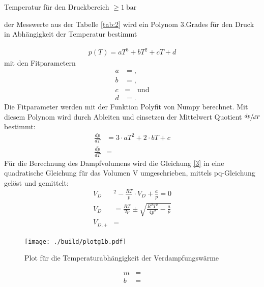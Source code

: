 \begin{table}[H]
    \centering
    
    \caption{Temperatur für den Druckbereich $\geq \SI{1}{\bar}$}
    \label{tab:2}
\end{table}

\justifying der Messwerte aus der Tabelle \ref{tab:2} wird ein Polynom
3.Grades für den Druck in Abhängigkeit der Temperatur bestimmt

\begin{align}
    p(T)= aT^3 +bT^2 +cT +d
\end{align}
mit den Fitparametern
\begin{align}
    a &= \text{},\\
    b &= \text{},\\
    c &= \text{} \quad \text{und}\\
    d &= \text{} .
\end{align}
Die Fitparameter werden mit der Funktion Polyfit von Numpy \cite{numpy} berechnet.
Mit diesem Polynom wird durch Ableiten und einsetzen der Mittelwert Quotient $\sfrac{dp}{dT}$ bestimmt:
\begin{align} 
    \frac{dp}{dT}&= 3\cdot a T^2+2\cdot b T+c\\
    \overline{\frac{dp}{dT}}&= \text{}
\end{align}
Für die Berechnung des Dampfvolumens wird die Gleichung \eqref{3} in eine 
quadratische Gleichung für das Volumen V umgeschrieben, mittels pq-Gleichung gelöst
und gemittelt:
\begin{align}
    V_D&^2-\frac{RT}{p}\cdot V_D+\frac{a}{p}=0\\
    V_D&= \frac{RT}{2p} \pm \sqrt{\frac{R^2T^2}{4p^2} -\frac{a}{p} }\\
    V_{D,+}&= \text{} 
\end{align}

\begin{figure}[H]
    \centering
    \texttt{[image: ./build/plotg1b.pdf]}
    \caption{Plot für die Temperaturabhängigkeit der Verdampfungswärme}
    \label{fig:5}
\end{figure}

\begin{align}
    m &= \text{}\\
    b &= \text{}
\end{align}


